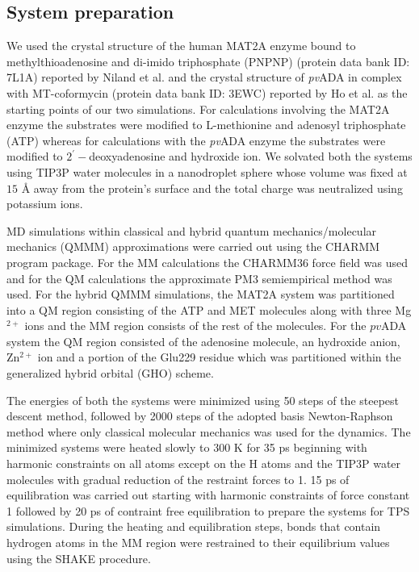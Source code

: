 \documentclass[journal=jpcbfk,manuscript=article,layout=traditional]{achemso}
\begin{document}
\subsection{System preparation}
We used the crystal structure of the human MAT2A enzyme 
bound to methylthioadenosine and di-imido triphosphate (PNPNP)
(protein data bank ID: 7L1A) reported by Niland 
et al. \cite{Niland21Biochem60p791,Ghosh21JAmChemSoc143p18325} and the crystal 
structure of \textit{pv}ADA in complex with MT-coformycin (protein data bank ID: 3EWC) 
reported by Ho et al. \cite{Ho09Biochemistry48p9618} as the starting points of our two 
simulations. For calculations involving the MAT2A enzyme the substrates were modified to 
L-methionine and adenosyl triphosphate (ATP) whereas for calculations with the \textit{pv}ADA
enzyme the substrates were modified to $2^{'}-$deoxyadenosine and hydroxide ion. 
We solvated both the systems using TIP3P water molecules \cite{Jorgensen83JChemPhys79p926}
in a nanodroplet sphere whose volume was fixed at $15$ {\AA}
away from the protein's surface and the total charge was neutralized 
using potassium ions. 

MD simulations within classical and hybrid quantum mechanics/molecular mechanics 
(QMMM) approximations were carried out using the CHARMM program 
package. \cite{Brooks83JComputChem4p187} 
For the MM calculations the CHARMM36 force field \cite{Brooks09JComputChem30p1545} 
was used and for the QM calculations the approximate PM3 semiempirical 
method \cite{Repasky02JComputChem23p1601} was used. 
For the hybrid QMMM simulations, the MAT2A system was partitioned into a QM
region consisting of the ATP and MET molecules along with three Mg$^{2+}$ ions 
and the MM region consists of the rest of the molecules. 
For the $pv$ADA system the QM region consisted of 
the adenosine molecule, an hydroxide anion, Zn$^{2+}$ ion and 
a portion of the Glu229 residue which was partitioned within the generalized 
hybrid orbital (GHO) scheme. \cite{Gao98JPhysChemA102p4714}  

The energies of both the systems were minimized using 50 steps of the 
steepest descent method, followed by 2000 steps of the
adopted basis Newton-Raphson method where only classical molecular mechanics 
was used for the dynamics. 
The minimized systems were
heated slowly to 300 K for 35 ps beginning with harmonic
constraints on all atoms except on the H atoms and the TIP3P 
water molecules with gradual reduction of the restraint forces to 1. 
15 ps of equilibration was carried out starting with harmonic 
constraints of force constant 1 followed by 20 ps of contraint free 
equilibration to prepare the systems for TPS simulations. 
During the heating and equilibration steps, bonds that contain 
hydrogen atoms in the MM region were restrained to their equilibrium values 
using the SHAKE procedure. \cite{Ryckaert77JComputPhys23p327} 
\end{document}

